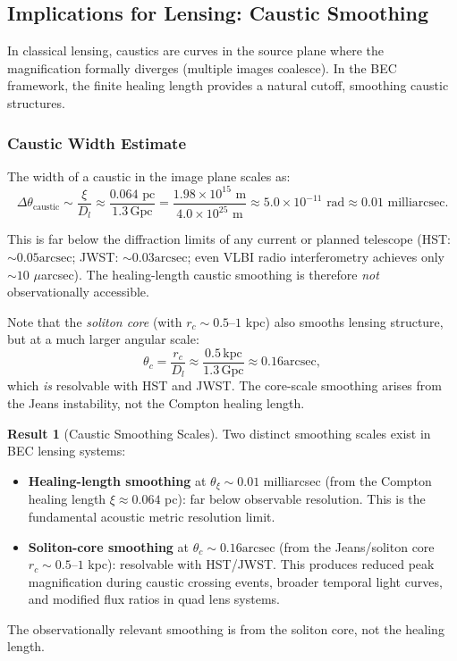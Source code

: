 \documentclass[11pt,a4paper]{article}
\newcommand{\ee}[1]{\times 10^{#1}}
\newcommand{\kpc}{\ensuremath{\mathrm{kpc}}}
\newcommand{\Gpc}{\ensuremath{\mathrm{Gpc}}}
\newcommand{\arcsec}{\ensuremath{\text{arcsec}}}
\theoremstyle{definition}
\newtheorem{result}{Result}[section]
\theoremstyle{remark}
\begin{document}
\subsection{Implications for Lensing: Caustic Smoothing}
\label{sec:caustic_smoothing}

In classical lensing, caustics are curves in the source plane where the magnification formally diverges (multiple images coalesce). In the BEC framework, the finite healing length provides a natural cutoff, smoothing caustic structures.

\subsubsection{Caustic Width Estimate}

The width of a caustic in the image plane scales as:
\begin{equation}
\Delta\theta_{\mathrm{caustic}} \sim \frac{\xi}{D_l} \approx \frac{0.064 \text{ pc}}{1.3 \, \Gpc} = \frac{1.98 \ee{15} \text{ m}}{4.0 \ee{25} \text{ m}} \approx 5.0 \ee{-11} \text{ rad} \approx 0.01 \text{ milliarcsec}.
\end{equation}

This is far below the diffraction limits of any current or planned telescope (HST: $\sim 0.05\arcsec$; JWST: $\sim 0.03\arcsec$; even VLBI radio interferometry achieves only $\sim 10$ $\mu$arcsec). The healing-length caustic smoothing is therefore \emph{not} observationally accessible.

Note that the \emph{soliton core} (with $r_c \sim 0.5$--$1$ kpc) also smooths lensing structure, but at a much larger angular scale:
\begin{equation}
\theta_c = \frac{r_c}{D_l} \approx \frac{0.5 \, \kpc}{1.3 \, \Gpc} \approx 0.16\arcsec,
\end{equation}
which \emph{is} resolvable with HST and JWST. The core-scale smoothing arises from the Jeans instability, not the Compton healing length.

\begin{result}[Caustic Smoothing Scales]
\label{res:caustic_smoothing}
Two distinct smoothing scales exist in BEC lensing systems:
\begin{itemize}[leftmargin=*, itemsep=0.2em]
\item \textbf{Healing-length smoothing} at $\theta_\xi \sim 0.01$ milliarcsec (from the Compton healing length $\xi \approx 0.064$ pc): far below observable resolution. This is the fundamental acoustic metric resolution limit.
\item \textbf{Soliton-core smoothing} at $\theta_c \sim 0.16\arcsec$ (from the Jeans/soliton core $r_c \sim 0.5$--$1$ kpc): resolvable with HST/JWST. This produces reduced peak magnification during caustic crossing events, broader temporal light curves, and modified flux ratios in quad lens systems.
\end{itemize}
The observationally relevant smoothing is from the soliton core, not the healing length.
\end{result}
\end{document}
